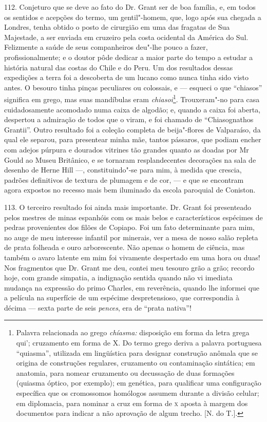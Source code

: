 112. Conjeturo que se deve ao fato do Dr. Grant ser de boa família, e,
em todos os sentidos e acepções do termo, um gentil"-homem, que, logo
após sua chegada a Londres, tenha obtido o posto de cirurgião em uma das
fragatas de Sua Majestade, a ser enviada em cruzeiro pela costa
ocidental da América do Sul. Felizmente a saúde de seus companheiros
deu"-lhe pouco a fazer, profissionalmente; e o doutor pôde dedicar a
maior parte do tempo a estudar a história natural das costas do Chile e
do Peru. Um dos resultados dessas expedições a terra foi a descoberta de
um lucano como nunca tinha sido visto antes. O besouro tinha pinças
peculiares ou colossais, e --- esqueci o que ``chiasos'' significa em
grego, mas suas mandíbulas eram \emph{chiasoi}\footnote{Palavra
  relacionada ao grego \emph{chíasma:} disposição em forma da letra
  grega qui'; cruzamento em forma de X. Do termo grego deriva a palavra
  portuguesa ``quiasma'', utilizada em lingüística para designar
  construção anômala que se origina de construções regulares, cruzamento
  ou contaminação sintática; em anatomia, para nomear cruzamento ou
  decussação de duas formações (quiasma óptico, por exemplo); em
  genética, para qualificar uma configuração específica que os
  cromossomos homólogos assumem durante a divisão celular; em
  diplomacia, para nominar a cruz em forma de \textsc{x} aposta à margem dos
  documentos para indicar a não aprovação de algum trecho. {[}N. do
  T.{]}.}. Trouxeram"-no para casa cuidadosamente acomodado numa caixa de
algodão; e, quando a caixa foi aberta, despertou a admiração de todos
que o viram, e foi chamado de ``Chiasognathos Grantii''. Outro resultado
foi a coleção completa de beija"-flores de Valparaíso, da qual ele
separou, para presentear minha mãe, tantos pássaros, que podiam encher
com adejos púrpura e dourados vitrines tão grandes quanto as doadas por
Mr Gould ao Museu Britânico, e se tornaram resplandecentes decorações na
sala de desenho de Herne Hill ---, constituindo"-se para mim, à medida que
crescia, padrões definitivos de textura de plumagem e de cor, --- e que se
encontram agora expostos no recesso mais bem iluminado da escola
paroquial de Coniston.

113. O terceiro resultado foi ainda mais importante. Dr. Grant foi
presenteado pelos mestres de minas espanhóis com os mais belos e
característicos espécimes de pedras provenientes dos filões de Copiapo.
Foi um fato determinante para mim, no auge de meu interesse infantil por
minerais, ver a mesa de nosso salão repleta de prata folheada e ouro
arborescente. Não apenas o homem de ciência, mas também o avaro latente
em mim foi vivamente despertado em uma hora ou duas! Nos fragmentos que
Dr. Grant me deu, contei meu tesouro grão a grão; recordo hoje, com
grande simpatia, a indignação sentida quando não vi imediata mudança na
expressão do primo Charles, em reverência, quando lhe informei que a
película na superfície de um espécime despretensioso, que correspondia à
décima --- sexta parte de seis \emph{pences}, era de ``prata nativa''!

